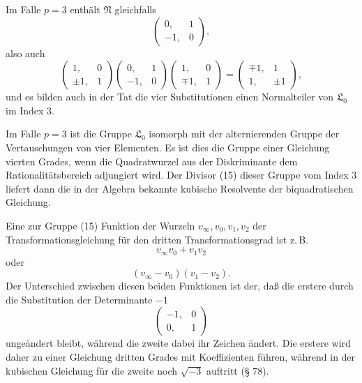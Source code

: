 Im Falle $p = 3$ enthält $\mathfrak{N}$ gleichfalls
\[
\begin{pmatrix} 0, & 1 \\ -1, & 0 \end{pmatrix},
\]
also auch
\[
\begin{pmatrix} 1, & 0 \\ \pm1, & 1 \end{pmatrix}\begin{pmatrix} 0, & 1 \\ -1, & 0 \end{pmatrix}\begin{pmatrix} 1, & 0 \\ \mp1, & 1 \end{pmatrix} = \begin{pmatrix} \mp1, & 1 \\ 1, & \pm1 \end{pmatrix},
\]
und es bilden auch in der Tat die vier Substitutionen
einen Normalteiler von $\mathfrak{L}_0$ im Index 3.

Im Falle $p = 3$ ist die Gruppe $\mathfrak{L}_0$ isomorph mit der alternierenden Gruppe der Vertauschungen von vier Elementen. Es ist dies die Gruppe einer  Gleichung vierten Grades, wenn die Quadratwurzel aus der Diskriminante dem Rationalitätsbereich adjungiert wird. Der Divisor (15) dieser Gruppe vom Index 3 liefert dann die in der Algebra bekannte kubische Resolvente der biquadratischen Gleichung.

Eine zur Gruppe (15)  Funktion der Wurzeln $v_\infty, v_0, v_1, v_2$ der Transformationsgleichung für den dritten Transformationsgrad ist z.\,B.
\[
v_\infty v_0 + v_1 v_2
\]
oder
\[
(v_\infty - v_0)(v_1 - v_2).
\]
Der Unterschied zwischen diesen beiden Funktionen ist der, daß die erstere durch die Substitution der Determinante $-1$
\[
\begin{pmatrix} -1, & 0 \\ 0, & 1 \end{pmatrix}
\]
ungeändert bleibt, während die zweite dabei ihr Zeichen ändert. Die erstere wird daher zu einer Gleichung dritten Grades mit  Koeffizienten führen, während in der kubischen Gleichung für die zweite noch $\sqrt{-3}$ auftritt (§ 78).
